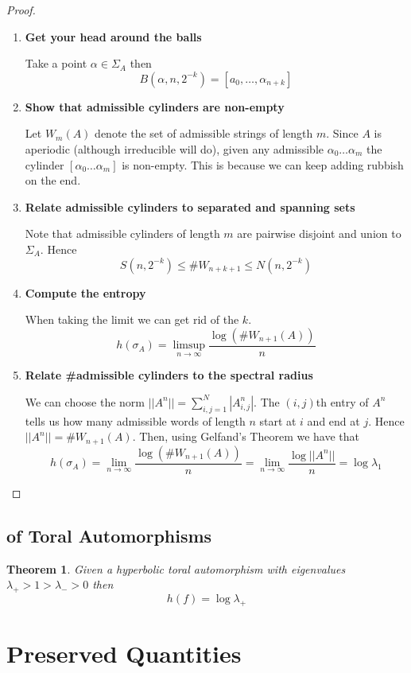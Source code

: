 \documentclass[11pt]{article}
\newcommand{\abs}[1]{|#1|}
\newcommand{\norm}[1]{||#1||}
\newtheorem{theorem}{Theorem}[section]
\begin{document}
\begin{proof}
\begin{enumerate}
	\item \textbf{Get your head around the balls}
		
		Take a point $\alpha\in\Sigma_A$ then
		\[
			B(\alpha, n, 2^{-k})=[a_0, \dots, \alpha_{n+k}]
		\]
	\item \textbf{Show that admissible cylinders are non-empty}

		Let $W_m(A)$ denote the set of admissible strings of length $m$.
		Since $A$ is aperiodic (although irreducible will do), given any admissible $\alpha_0\dots\alpha_m$ the cylinder $\left[\alpha_0\dots\alpha_m\right]$ is non-empty.
		This is because we can keep adding rubbish on the end.
	\item \textbf{Relate admissible cylinders to separated and spanning sets}

		Note that admissible cylinders of length $m$ are pairwise disjoint and union to $\Sigma_A$.
		Hence
		\[
			S(n, 2^{-k}) \leq \#W_{n+k+1} \leq N(n, 2^{-k})
		\]
	\item \textbf{Compute the entropy}

		When taking the limit we can get rid of the $k$.
		\[
			h\left(\sigma_A\right)= \limsup_{n\to\infty}\frac{\log(\#W_{n+1}(A))}{n}
		\]
	\item \textbf{Relate \#admissible cylinders to the spectral radius}

		We can choose the norm $\norm{A^n}=\sum_{i,j =1}^N \abs{A^n_{i,j}}$.
		The $(i,j)$th entry of $A^n$ tells us how many admissible words of length $n$ start at $i$ and end at $j$.
		Hence $\norm{A^n}=\#W_{n+1}(A)$.
		Then, using Gelfand's Theorem we have that
		\[
			h\left(\sigma_A\right)=\lim_{n\to\infty}\frac{\log(\#W_{n+1}(A))}{n}=\lim_{n\to\infty}\frac{\log\norm{A^n}}{n}=\log\lambda_1
		\]
\end{enumerate}
\end{proof}

\subsection{of Toral Automorphisms}
\begin{theorem}
Given a hyperbolic toral automorphism with eigenvalues $\lambda_+ > 1 > \lambda_->0$ then
\[
	h(f)=\log \lambda_+
\]
\end{theorem}

\section{Preserved Quantities}
\end{document}
